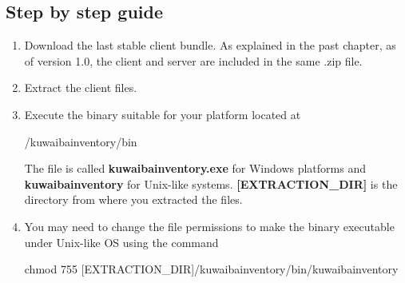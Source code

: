 \documentclass[a4paper]{article}
\begin{document}
				\subsection{Step by step guide}
					\begin{enumerate}
						\item Download the last stable client bundle. As explained in the past chapter, as of version 1.0, the client and server are included in the same .zip file.
						\item Extract the client files.
						\item Execute the binary suitable for your platform located at
						\begin{verbbox}
							/kuwaibainventory/bin
						\end{verbbox}
						\begin{figure}[ht]
							\centering	
							\theverbbox
						\end{figure}
						The file is called \textbf{kuwaibainventory.exe} for Windows platforms and \textbf{kuwaibainventory} for Unix-like systems. \textbf{[EXTRACTION\_DIR]} is the directory from where you extracted the files.
						\item You may need to change the file permissions to make the binary executable under Unix-like OS using the command
						\begin{verbbox}
							chmod 755 [EXTRACTION_DIR]/kuwaibainventory/bin/kuwaibainventory
						\end{verbbox}
						\begin{figure}[ht]
							\centering	
							\theverbbox
						\end{figure}	
						
					\end{enumerate}
\end{document}
